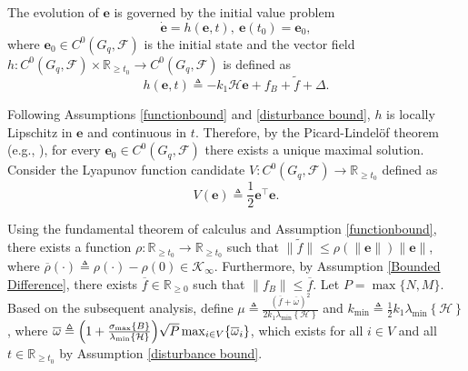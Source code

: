 \documentclass[letterpaper, 10 pt, conference]{ieeeconf}
\newcommand{\maps}{\colon}
\newcommand{\R}{\mathbb{R}}
\newcommand{\FF}{\mathcal{F}}
\theoremstyle{definition}
\begin{document}
The evolution of $\mathbf{e}$ is governed by the initial value problem
\begin{equation}
\dot{\mathbf{e}}=h\left(\mathbf{e},t\right),\ \mathbf{e}\left(t_{0}\right)=\mathbf{e}_{0},\label{eq:IVP}
\end{equation}
where $\mathbf{e}_{0}\in C^0(G_q,\FF)$
is the initial state and the vector field $h\maps C^0(G_q,\FF)\times\R_{\geq t_0}\to C^0(G_q,\FF)$ is defined as
\begin{equation}\label{eq:CLES}
h(\mathbf{e},t)\triangleq -k_1\mathcal{H}\mathbf{e} + f_B + \tilde{f} + \Delta.
\end{equation}

Following Assumptions \ref{functionbound} and \ref{disturbance bound}, $h$ is locally Lipschitz in $\mathbf{e}$ and continuous in $t$. Therefore, by the Picard-Lindelöf theorem (e.g., \cite[Chapter 1, Theorem 3.1]{Coddington.Earl1956}), for every $\mathbf{e}_{0}\in C^0(G_q,\FF)$ there exists a unique maximal solution. Consider the Lyapunov function candidate $V\maps C^0(G_q,\FF)\to\mathbb{R}_{\geq t_0}$
defined as
\begin{equation}
V\left(\mathbf{e}\right)\triangleq\frac{1}{2}\mathbf{e}^{\top}\mathbf{e}.\label{eq:Lyapunov}
\end{equation}

Using the fundamental theorem of calculus and Assumption \ref{functionbound},
there exists a function $\rho\maps\mathbb{R}_{\geq t_0}\to\mathbb{R}_{\geq t_0}$
such that $\| \tilde{f} \| \leq\rho (\|\mathbf{e}\|) \|\mathbf{e}\| $, where $\overline{\rho}\left(\cdot\right)\triangleq\rho\left(\cdot\right)-\rho\left(0\right) \in \mathcal{K}_\infty$. Furthermore, by Assumption
\ref{Bounded Difference}, there exists $\overline{f}\in\mathbb{R}_{\geq0}$
such that $\| f_{B} \| \leq\overline{f}$. Let $P = \max\{N,M\}$. Based on the subsequent analysis, define $\mu\triangleq\frac{\left(\overline{f}+\overline{\omega}\right)^{2}}{2k_{1}\lambda_{\min}\left\{ \mathcal{H}\right\} }$
and $k_{\min}\triangleq\frac{1}{2}k_{1}\lambda_{\min}\left\{ \mathcal{H}\right\} $, where $\overline{\omega}\triangleq \Bigl(1 + \frac{\sigma_\mathrm{max}\{B\}}{\lambda_\mathrm{min}\{\mathcal{H}\}}\Bigr)\sqrt{P}\max_{i\in V} \{\overline{\omega}_i \}$, which exists for all $i\in V$ and all $t\in\mathbb{R}_{\geq t_0}$
by Assumption \ref{disturbance bound}.
\end{document}
